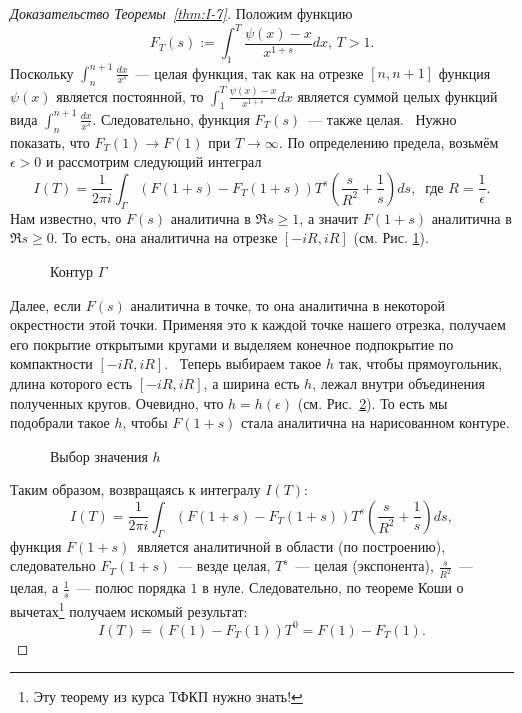 \begin{proof}[Доказательство Теоремы~\ref{thm:I-7}]
    Положим функцию
    \[
        F_T(s) := \int_{1}^{T} \frac{\psi(x) - x}{x^{1+s}}dx, \, T > 1.
    \]
    Поскольку $\int_{n}^{n+1} \frac{dx}{x^s}$ --- целая функция, так как на отрезке $[n, n+1]$ функция $\psi(x)$ является постоянной, то $\int_{1}^{T} \frac{\psi(x) - x}{x^{1+s}}dx$ является суммой целых функций вида $\int_{n}^{n+1}\frac{dx}{x^s}$. Следовательно, функция $F_T(s)$ --- также целая.~\newline
    Нужно показать, что $F_T(1) \to F(1)$ при $T \to \infty$. По определению предела, возьмём $\epsilon > 0$ и рассмотрим следующий интеграл
    \[
        I(T) = \frac{1}{2\pi i}\int_{\Gamma} \left( F(1+s) - F_T(1+s) \right) T^s \left(\frac{s}{R^2} + \frac{1}{s}\right)ds, \ \text{ где } R = \frac{1}{\epsilon}.
    \]
    Нам известно, что $F(s)$ аналитична в $\Re{s} \ge 1$, а значит $F(1+s)$ аналитична в $\Re{s} \ge 0$. То есть, она аналитична на отрезке $[-iR, iR]$ (см. Рис. \ref{fg:I-1}).
    \begin{figure}[h]
        \centering
        
        \caption{Контур $\Gamma$}
        \label{fg:I-1}
    \end{figure}

    \noindent Далее, если $F(s)$ аналитична в точке, то она аналитична в некоторой окрестности этой точки. Применяя это к каждой точке нашего отрезка, получаем его покрытие открытыми кругами и выделяем конечное подпокрытие по компактности $[-iR, iR]$.~\newline
    Теперь выбираем такое $h$ так, чтобы прямоугольник, длина которого есть $[-iR, iR]$, а ширина есть $h$, лежал внутри объединения полученных кругов. Очевидно, что $h = h(\epsilon)$ (см. Рис.~\ref{fg:I-2}). То есть мы подобрали такое $h$, чтобы $F(1+s)$ стала аналитична на нарисованном контуре.
    \begin{figure}[ht]
        \centering
        
        \caption{Выбор значения $h$}
        \label{fg:I-2}
    \end{figure}

    Таким образом, возвращаясь к интегралу $I(T)$:
    \[
        I(T) = \frac{1}{2\pi i}\int_{\Gamma} \left( F(1+s) - F_T(1+s) \right) T^s \left(\frac{s}{R^2} + \frac{1}{s}\right)ds,
    \]
    функция $F(1+s)$ является аналитичной в области (по построению), следовательно $F_T(1+s)$ --- везде целая, $T^s$ --- целая (экспонента), $\frac{s}{R^2}$ --- целая, а $\frac{1}{s}$ --- полюс порядка $1$ в нуле. Следовательно, по теореме Коши о вычетах\footnote{Эту теорему из курса ТФКП нужно знать!}
    получаем искомый результат:
    \[
        I(T) = \left(F(1) - F_T(1)\right)T^0 = F(1) - F_T(1).
    \]
\end{proof}

